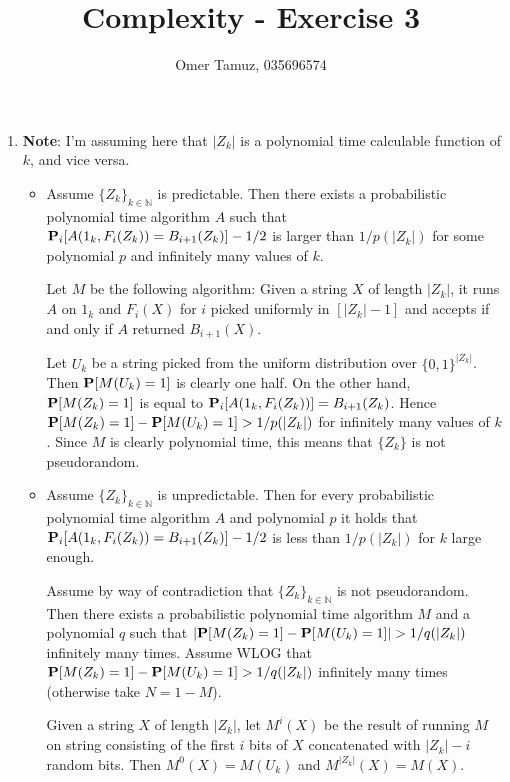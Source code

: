 \documentclass[11pt]{article} \usepackage{amssymb}
\newcommand{\N}{\mathbb N} \newcommand{\R}{\mathbb R}
\begin{document}
\title{Complexity - Exercise 3}

 \author{Omer Tamuz, 035696574}
\maketitle


\begin{enumerate}
\item
  {\bf Note}: I'm assuming here that $|Z_k|$ is a polynomial time calculable 
  function of $k$, and vice versa.
  \begin{itemize}
  \item 
    
    Assume $\{Z_k\}_{k\in \N}$ is predictable. Then there exists a 
    probabilistic polynomial time algorithm $A$ such
    that $\P_i[A(1_k, F_i(Z_k)) = B_{i+1} (Z_k )]-1/2$ is larger than 
    $1/p(|Z_k|)$ for
    some polynomial $p$ and infinitely many values of $k$.
    
    Let $M$ be the following algorithm: Given a string $X$ of length 
    $|Z_k|$, it runs $A$ on $1_k$ and $F_i(X)$ for $i$ picked uniformly in $[|Z_k|-1]$ 
    and accepts if and only if $A$ returned $B_{i+1}(X)$.

    Let $U_k$ be a string picked from the uniform distribution over 
    $\{0,1\}^{|Z_k|}$.
    Then $\P[M(U_k)=1]$ is clearly one half. On the other hand, 
    $\P[M(Z_k)=1]$ is equal to $\P_i[A(1_k,F_i(Z_k))]=B_{i+1}(Z_k)$.
    Hence $\P[M(Z_k)=1]-\P[M(U_k)=1]>1/p(|Z_k|)$ for infinitely many values of 
    $k$. Since $M$ is clearly polynomial time, this means that $\{Z_k\}$ is not
    pseudorandom.
  \item
    Assume $\{Z_k\}_{k\in \N}$ is unpredictable. Then for every probabilistic 
    polynomial time algorithm $A$ and polynomial $p$ it holds that
    $\P_i[A(1_k, F_i(Z_k)) = B_{i+1} (Z_k )]-1/2$ is less than 
    $1/p(|Z_k|)$ for $k$ large enough.

    Assume by way of contradiction that $\{Z_k\}_{k\in \N}$ is not 
    pseudorandom. Then there exists a probabilistic polynomial time algorithm 
    $M$ and a polynomial $q$ such that  $|\P[M(Z_k)=1]-\P[M(U_k)=1]|>1/q(|Z_k|)$
    infinitely many times. Assume WLOG that $\P[M(Z_k)=1]-\P[M(U_k)=1]>1/q(|Z_k|)$
    infinitely many times (otherwise take $N=1-M$). 

    Given a string $X$ of length $|Z_k|$, let $M^i(X)$ be the result of 
    running $M$ on string consisting of the first $i$ bits of $X$ concatenated
    with $|Z_k|-i$ random bits. Then $M^0(X)=M(U_k)$ and $M^{|Z_k|}(X)=M(X)$.


\end{itemize}
\end{enumerate}
\end{document}
